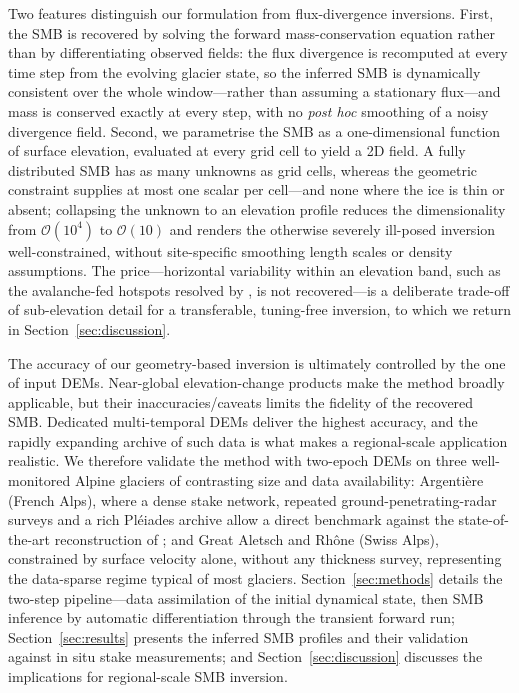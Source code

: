 Two features distinguish our formulation from flux-divergence inversions. First, the SMB is recovered by solving the forward mass-conservation equation rather than by differentiating observed fields: the flux divergence is recomputed at every time step from the evolving glacier state, so the inferred SMB is dynamically
consistent over the whole window---rather than assuming a stationary flux---and mass is conserved exactly at every step, with no \emph{post hoc} smoothing of a noisy divergence field. Second, we parametrise the SMB as a one-dimensional function of surface elevation, evaluated at every grid cell to yield a 2D field. A fully distributed SMB has as many unknowns as grid cells, whereas the geometric constraint supplies at most one scalar per cell---and none where the ice is thin or absent; collapsing the unknown to an elevation profile reduces the dimensionality from $\mathcal{O}(10^4)$ to $\mathcal{O}(10)$ and renders the otherwise severely ill-posed inversion well-constrained, without site-specific smoothing length scales or density assumptions. The price---horizontal variability within an elevation band, such as the avalanche-fed hotspots resolved by \citet{kneib2024}, is not recovered---is a deliberate trade-off of sub-elevation detail for a transferable, tuning-free inversion, to which we return in Section~\ref{sec:discussion}.

The accuracy of our geometry-based inversion is ultimately controlled by the one of input DEMs. Near-global elevation-change products \citep{hugonnet2021} make the method broadly applicable, but their inaccuracies/caveats limits the fidelity of the recovered SMB. Dedicated multi-temporal DEMs deliver the highest accuracy, and the rapidly expanding archive of such data is what makes a regional-scale application realistic. We therefore validate the method with two-epoch DEMs on three well-monitored Alpine glaciers of contrasting size and data availability: Argentière (French Alps), where a dense stake network, repeated ground-penetrating-radar surveys and a rich Pléiades archive allow a direct benchmark against the state-of-the-art reconstruction of
\citet{kneib2024}; 
and Great Aletsch and Rhône (Swiss Alps), constrained by surface velocity alone, without any thickness survey, representing the data-sparse regime typical of most glaciers. Section~\ref{sec:methods} details the two-step pipeline---data assimilation of the initial dynamical state, then SMB inference by
automatic differentiation through the transient forward run; Section~\ref{sec:results} presents the inferred SMB profiles and their validation against in situ stake measurements; and Section~\ref{sec:discussion} discusses the implications for regional-scale SMB inversion.
